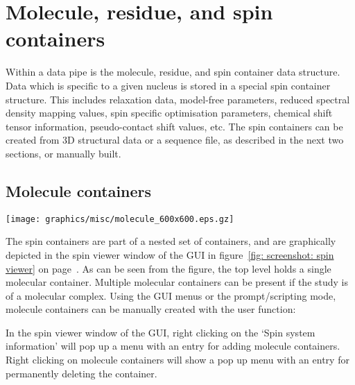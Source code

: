 
\section{Molecule, residue, and spin containers}

Within a data pipe is the molecule, residue, and spin container data structure.  Data which is specific to a given nucleus is stored in a special spin container structure.  This includes relaxation data, model-free parameters, reduced spectral density mapping values, spin specific optimisation parameters, chemical shift tensor information, pseudo-contact shift values, etc.  The spin containers can be created from 3D structural data or a sequence file, as described in the next two sections, or manually built.




\newpage
\subsection{Molecule containers}

\begin{figure*}[h]
\texttt{[image: graphics/misc/molecule\_600x600.eps.gz]}
\end{figure*}

The spin containers are part of a nested set of containers, and are graphically depicted in the spin viewer window of the GUI in figure~\ref{fig: screenshot: spin viewer} on page~\pageref{fig: screenshot: spin viewer}.  As can be seen from the figure, the top level holds a single molecular container.  Multiple molecular containers can be present if the study is of a molecular complex.  Using the GUI menus or the prompt/scripting mode, molecule containers can be manually created with the user function:


In the spin viewer window of the GUI, right clicking on the `Spin system information' will pop up a menu with an entry for adding molecule containers.  Right clicking on molecule containers will show a pop up menu with an entry for permanently deleting the container.




